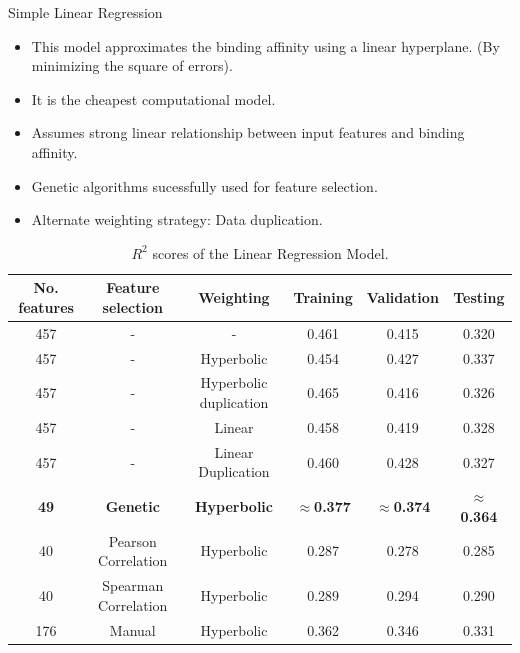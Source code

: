 \documentclass{beamer}
\begin{document}
\begin{frame}[t]{Simple Linear Regression}
\begin{itemize}
\item This model approximates the binding affinity using a linear hyperplane.  (By minimizing the square of errors).
\item It is the cheapest computational model.
\item Assumes strong linear relationship between input features and binding affinity.
\item Genetic algorithms sucessfully used for feature selection.
\item Alternate weighting strategy: Data duplication.
\end{itemize}

\begin{table} [h!]
\centering
\resizebox{0.75\linewidth}{!} {
\begin{tabular}{ | c | c | c | c | c | c | }
\hline
\textbf{No.  features} & \textbf{Feature selection} & \textbf{Weighting} & \textbf{Training} & \textbf{Validation} & \textbf{Testing} \\ [0.5 ex]
\hline \hline
457 & - & - & 0.461 & 0.415 & 0.320\\
457 &  - & Hyperbolic & 0.454 & 0.427 & 0.337\\
457 & - & Hyperbolic duplication & 0.465 & 0.416 & 0.326\\
457 & - & Linear & 0.458 & 0.419 & 0.328\\
457 & - & Linear Duplication & 0.460 & 0.428 & 0.327\\
\textbf{49} & \textbf{Genetic} & \textbf{Hyperbolic} & \textbf{$\approx$0.377} & \textbf{$\approx$0.374}  & \textbf{$\approx$0.364}\\
40 & Pearson Correlation & Hyperbolic & 0.287 & 0.278  & 0.285 \\ 
40 & Spearman Correlation & Hyperbolic & 0.289 & 0.294  & 0.290 \\ 
176 & Manual & Hyperbolic & 0.362  & 0.346  & 0.331\\ [1ex]
\hline
\end{tabular}
}
\caption{$R^2$ scores of the Linear Regression Model.}
\label {table:1}
\end{table}

\end{frame}
\end{document}
